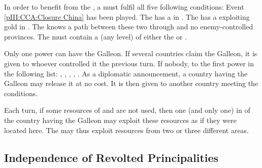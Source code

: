 \label{chSpecific:Manila Galleon}
\aparag In order to benefit from the , a \MAJ must
fulfil all five following conditions:
\bparag Event \ref{pIII:CCA:Closure China} has been played.
\bparag The \MAJ has a \COL in \granderegionPhilippines.
\bparag The \MAJ has a \COL exploiting gold in .
\bparag The \MAJ knows a path between these two \COL through
 and no enemy-controlled provinces.
\bparag The  must contain a \TradeFLEET (any level) of either the
\MAJ or \paysChine.

\aparag Only one power can have the Galleon. If several countries claim the
Galleon, it is given to whoever controlled it the previous turn. If nobody, to
the first power in the following list: \HIS, \POR, \HOL, \ANG, \FRA.
\bparag As a diplomatic announcement, a country having the Galleon may release
it at no cost. It is then given to another country meeting the conditions.

\aparag Each turn, if some resources of \granderegionNankin and
\granderegionCanton are not used, then one (and only one) \COL in
\granderegionPhilippines of the country having the Galleon may exploit these
resources as if they were located here.
\bparag The \COL may thus exploit resources from two or three different areas.



\subsection{Independence of Revolted
  Principalities}\label{chSpecific:Peace:Independence Revolt}

